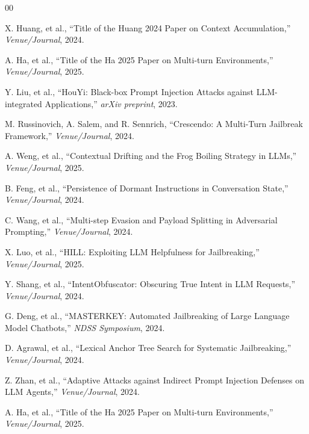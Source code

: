 \documentclass[10pt, a4paper]{article}
\begin{document}

\begin{thebibliography}{00}

X. Huang, et al., ``Title of the Huang 2024 Paper on Context Accumulation,'' \textit{Venue/Journal}, 2024.

A. Ha, et al., ``Title of the Ha 2025 Paper on Multi-turn Environments,'' \textit{Venue/Journal}, 2025.

Y. Liu, et al., ``HouYi: Black-box Prompt Injection Attacks against LLM-integrated Applications,'' \textit{arXiv preprint}, 2023.

M. Russinovich, A. Salem, and R. Sennrich, ``Crescendo: A Multi-Turn Jailbreak Framework,'' \textit{Venue/Journal}, 2024.

A. Weng, et al., ``Contextual Drifting and the Frog Boiling Strategy in LLMs,'' \textit{Venue/Journal}, 2025.

B. Feng, et al., ``Persistence of Dormant Instructions in Conversation State,'' \textit{Venue/Journal}, 2024.

C. Wang, et al., ``Multi-step Evasion and Payload Splitting in Adversarial Prompting,'' \textit{Venue/Journal}, 2024.

X. Luo, et al., ``HILL: Exploiting LLM Helpfulness for Jailbreaking,'' \textit{Venue/Journal}, 2025.

Y. Shang, et al., ``IntentObfuscator: Obscuring True Intent in LLM Requests,'' \textit{Venue/Journal}, 2024.

G. Deng, et al., ``MASTERKEY: Automated Jailbreaking of Large Language Model Chatbots,'' \textit{NDSS Symposium}, 2024. %

D. Agrawal, et al., ``Lexical Anchor Tree Search for Systematic Jailbreaking,'' \textit{Venue/Journal}, 2024. %

Z. Zhan, et al., ``Adaptive Attacks against Indirect Prompt Injection Defenses on LLM Agents,'' \textit{Venue/Journal}, 2024. %

A. Ha, et al., ``Title of the Ha 2025 Paper on Multi-turn Environments,'' \textit{Venue/Journal}, 2025.


\end{thebibliography}
\end{document}
